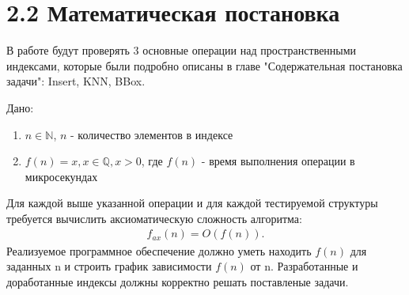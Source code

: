\section{2.2 Математическая постановка}
\label{cha:math}

В работе будут проверять 3 основные операции над пространственными индексами, которые были подробно описаны в главе "Содержательная постановка задачи": Insert, KNN, BBox.

Дано:
\begin{enumerate}
    \item $n \in \mathbb{N}$, $n$ - количество элементов в индексе
    \item $f(n) = x, x \in  \mathbb{Q}, x > 0$, где $f(n)$ - время выполнения операции в микросекундах
\end{enumerate}
Для каждой выше указанной операции и для каждой тестируемой структуры требуется вычислить аксиоматическую сложность алгоритма:
  \newline
\begin{align}
    f_{ax}(n) = O(f(n)).
\end{align}
  \newline
Реализуемое программное обеспечение должно уметь находить $f(n)$ для заданных n и строить график зависимости $f(n)$ от n.
Разработанные и доработанные индексы должны корректно решать поставленые задачи. 
